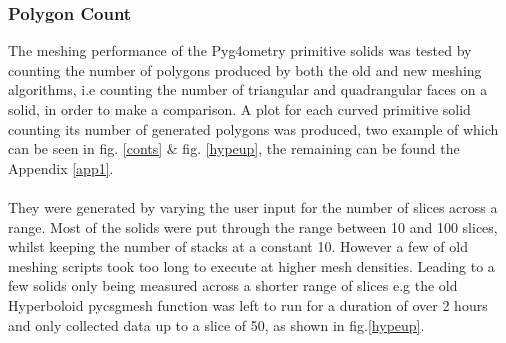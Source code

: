 \documentclass[12pt,a4paper]{article}
\begin{document}
\subsubsection{Polygon Count}
The meshing performance of the Pyg4ometry primitive solids was tested by counting the number of polygons produced by both the old and new meshing algorithms, i.e counting the number of triangular and quadrangular faces on a solid, in order to make a comparison. A plot for each curved primitive solid counting its number of generated polygons was produced, two example of which can be seen in fig. \ref{conts} \& fig. \ref{hypeup}, the remaining can be found the Appendix \ref{app1}.
\\\\
They were generated by varying the user input for the number of slices across a range. Most of the solids were put through the range between 10 and 100 slices, whilst keeping the number of stacks at a constant 10. However a few of old meshing scripts took too long to execute at higher mesh densities. Leading to a few solids only being measured across a shorter range of slices e.g the old Hyperboloid pycsgmesh function was left to run for a duration of over 2 hours and only collected data up to a slice of 50, as shown in fig.\ref{hypeup}.  \\
\end{document}
